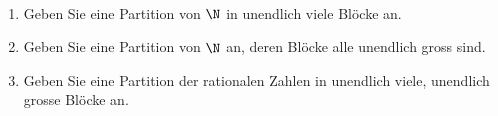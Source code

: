 \begin{example}~
\begin{enumerate}
\item Geben Sie eine Partition von $\N$ in unendlich viele Blöcke an.
\item Geben Sie eine Partition von $\N$ an, deren Blöcke alle unendlich gross sind.
\item Geben Sie eine Partition der rationalen Zahlen in unendlich viele, unendlich grosse
Blöcke an.
\end{enumerate}
\end{example}
\begin{example}
\end{example}